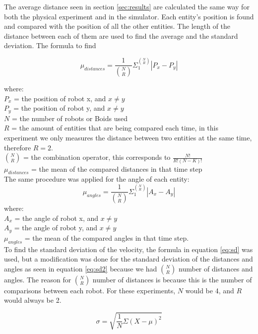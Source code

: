 The average distance seen in section \ref{sec:results} are calculated the same way for both the physical experiment and in the simulator. Each entity's position is found and compared with the position of all the other entities. The length of the distance between each of them are used to find the average and the standard deviation.
The formula to find 

\begin{equation}
\mu_{distances} = \frac{1}{ {N \choose R}} \Sigma_1^{N \choose R} | P_x - P_y |
\end{equation}

where:
\\
$P_x$ = the position of robot x, and $x \neq y$
\\
$P_y$ = the position of robot y, and $x \neq y$
\\
$N$ = the number of robots or Boids used
\\
$R$ = the amount of entities that are being compared each time, in this experiment we only measures the distance between two entities at the same time, therefore $R = 2$.
\\
$N \choose R$ = the combination operator, this corresponds to $ \frac{N!}{R! (N-K)!}$
\\
$\mu_{distances}$ = the mean of the compared distances in that time step
\\

The same procedure was applied for the angle of each entity: 
\begin{equation}
\mu_{angles} = \frac{1}{ {N \choose R}} \Sigma_1^{N \choose R} | A_x - A_y |
\end{equation}
where:
\\
$A_x$ = the angle of robot x, and $x \neq y$
\\
$A_y$ = the angle of robot y, and $x \neq y$
\\
$\mu_{angles}$ = the mean of the compared angles in that time step.
\\

To find the standard deviation of the velocity, the formula in equation \ref{eq:sd} was used, but a modification was done for the standard deviation of the distances and angles as seen in equation \ref{eq:sd2} because we had $ {N \choose R}$ number of distances and angles. The reason for $ {N \choose R}$ number of distances is because this is the number of comparisons between each robot. For these experiments, $N$ would be 4, and $R$ would always be 2.


\begin{equation}
\label{eq:sd}
\sigma =  \sqrt{\frac{1}{N}\Sigma(X-\mu)^2}
\end{equation}

